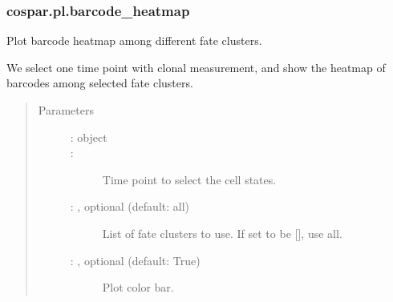 \documentclass[letterpaper,10pt,english]{sphinxmanual}
\begin{document}
\subsubsection{cospar.pl.barcode\_heatmap}
\label{\detokenize{cospar.pl.barcode_heatmap:cospar-pl-barcode-heatmap}}\label{\detokenize{cospar.pl.barcode_heatmap::doc}}

\begin{fulllineitems}
\label{\detokenize{cospar.pl.barcode_heatmap:cospar.pl.barcode_heatmap}}
Plot barcode heatmap among different fate clusters.

We select one time point with clonal measurement, and show the
heatmap of barcodes among selected fate clusters.
\begin{quote}\begin{description}
\item[{Parameters}] \leavevmode\begin{description}
\item[{ :  object}] \leavevmode


\item[{ : }] \leavevmode
Time point to select the cell states.

\item[{ : , optional (default: all)}] \leavevmode
List of fate clusters to use. If set to be {[}{]}, use all.

\item[{ : , optional (default: True)}] \leavevmode
Plot color bar.

\end{description}

\end{description}\end{quote}

\end{fulllineitems}
\end{document}
